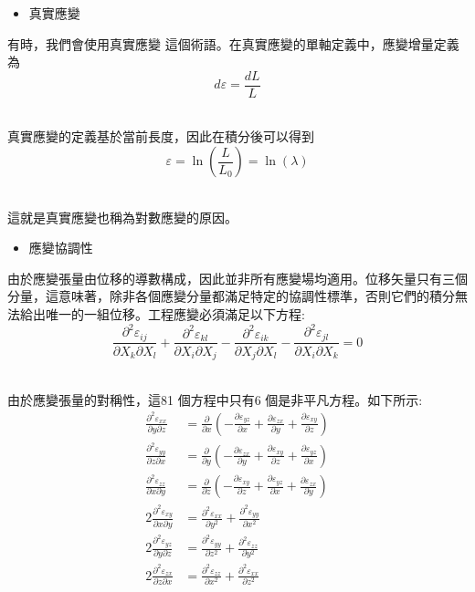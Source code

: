 \begin{itemize}
\item 真實應變
\end{itemize}

有時，我們會使用真實應變 這個術語。在真實應變的單軸定義中，應變增量定義為\
$$d \varepsilon=\frac{d L}{L}$$\

真實應變的定義基於當前長度，因此在積分後可以得到\
$$\varepsilon=\ln \left(\frac{L}{L_0}\right)=\ln (\lambda)$$\

這就是真實應變也稱為對數應變的原因。\\

\begin{itemize}
\item 應變協調性
\end{itemize}

由於應變張量由位移的導數構成，因此並非所有應變場均適用。位移矢量只有三個分量，這意味著，除非各個應變分量都滿足特定的協調性標準，否則它們的積分無法給出唯一的一組位移。工程應變必須滿足以下方程:\
$$\frac{\partial^2 \varepsilon_{i j}}{\partial X_k \partial X_l}+\frac{\partial^2 \varepsilon_{k l}}{\partial X_i \partial X_j}-\frac{\partial^2 \varepsilon_{i k}}{\partial X_j \partial X_l}-\frac{\partial^2 \varepsilon_{j l}}{\partial X_i \partial X_k}=0$$\

由於應變張量的對稱性，這81 個方程中只有6 個是非平凡方程。如下所示:\
$$
\begin{aligned}
\frac{\partial^2 \varepsilon_{x x}}{\partial y \partial z} & =\frac{\partial}{\partial x}\left(-\frac{\partial \varepsilon_{y z}}{\partial x}+\frac{\partial \varepsilon_{z x}}{\partial y}+\frac{\partial \varepsilon_{x y}}{\partial z}\right) \\
\frac{\partial^2 \varepsilon_{y y}}{\partial z \partial x} & =\frac{\partial}{\partial y}\left(-\frac{\partial \varepsilon_{z x}}{\partial y}+\frac{\partial \varepsilon_{x y}}{\partial z}+\frac{\partial \varepsilon_{y z}}{\partial x}\right) \\
\frac{\partial^2 \varepsilon_{z z}}{\partial x \partial y} & =\frac{\partial}{\partial z}\left(-\frac{\partial \varepsilon_{x y}}{\partial z}+\frac{\partial \varepsilon_{y z}}{\partial x}+\frac{\partial \varepsilon_{z x}}{\partial y}\right) \\
2 \frac{\partial^2 \varepsilon_{x y}}{\partial x \partial y} & =\frac{\partial^2 \varepsilon_{x x}}{\partial y^2}+\frac{\partial^2 \varepsilon_{y y}}{\partial x^2} \\
2 \frac{\partial^2 \varepsilon_{y z}}{\partial y \partial z} & =\frac{\partial^2 \varepsilon_{y y}}{\partial z^2}+\frac{\partial^2 \varepsilon_{z z}}{\partial y^2} \\
2 \frac{\partial^2 \varepsilon_{z x}}{\partial z \partial x} & =\frac{\partial^2 \varepsilon_{z z}}{\partial x^2}+\frac{\partial^2 \varepsilon_{x x}}{\partial z^2}
\end{aligned}
$$\


